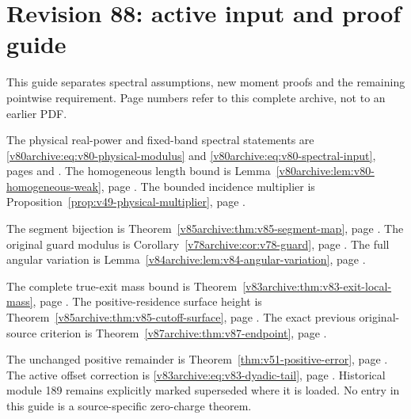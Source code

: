 \part*{Revision 88: active input and proof guide}
This guide separates spectral assumptions, new moment proofs and the
remaining pointwise requirement. Page numbers refer to this complete
archive, not to an earlier PDF.

The physical real-power and fixed-band spectral statements are
\eqref{v80archive:eq:v80-physical-modulus} and
\eqref{v80archive:eq:v80-spectral-input}, pages
\pageref{v80archive:eq:v80-physical-modulus} and
\pageref{v80archive:eq:v80-spectral-input}. The homogeneous length
bound is Lemma~\ref{v80archive:lem:v80-homogeneous-weak}, page
\pageref{v80archive:lem:v80-homogeneous-weak}. The bounded incidence
multiplier is Proposition~\ref{prop:v49-physical-multiplier}, page
\pageref{prop:v49-physical-multiplier}.

The segment bijection is Theorem~\ref{v85archive:thm:v85-segment-map},
page \pageref{v85archive:thm:v85-segment-map}. The original guard
modulus is Corollary~\ref{v78archive:cor:v78-guard}, page
\pageref{v78archive:cor:v78-guard}. The full angular variation is
Lemma~\ref{v84archive:lem:v84-angular-variation}, page
\pageref{v84archive:lem:v84-angular-variation}.

The complete true-exit mass bound is
Theorem~\ref{v83archive:thm:v83-exit-local-mass}, page
\pageref{v83archive:thm:v83-exit-local-mass}. The positive-residence
surface height is Theorem~\ref{v85archive:thm:v85-cutoff-surface},
page \pageref{v85archive:thm:v85-cutoff-surface}. The exact previous
original-source criterion is Theorem~\ref{v87archive:thm:v87-endpoint},
page \pageref{v87archive:thm:v87-endpoint}.

The unchanged positive remainder is Theorem~\ref{thm:v51-positive-error},
page \pageref{thm:v51-positive-error}. The active offset correction is
\eqref{v83archive:eq:v83-dyadic-tail}, page
\pageref{v83archive:eq:v83-dyadic-tail}. Historical module 189 remains
explicitly marked superseded where it is loaded. No entry in this guide
is a source-specific zero-charge theorem.
